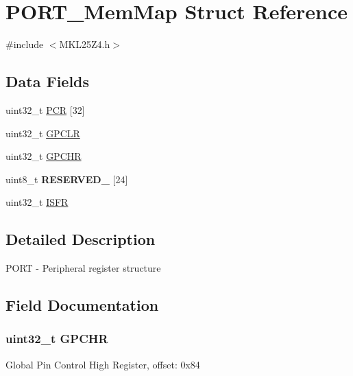 \hypertarget{struct_p_o_r_t___mem_map}{}\section{P\+O\+R\+T\+\_\+\+Mem\+Map Struct Reference}
\label{struct_p_o_r_t___mem_map}


{\ttfamily \#include $<$M\+K\+L25\+Z4.\+h$>$}

\subsection*{Data Fields}
\begin{DoxyCompactItemize}
\item 
uint32\+\_\+t \hyperlink{struct_p_o_r_t___mem_map_ad806aad894fe96382a78c6119527d0e8}{P\+C\+R} \mbox{[}32\mbox{]}
\item 
uint32\+\_\+t \hyperlink{struct_p_o_r_t___mem_map_a6e7a9e797813e20f3c1719d92158e1c9}{G\+P\+C\+L\+R}
\item 
uint32\+\_\+t \hyperlink{struct_p_o_r_t___mem_map_afad5aeb555260e7012ee2201815668a2}{G\+P\+C\+H\+R}
\item 
\hypertarget{struct_p_o_r_t___mem_map_a33a1c574e559dc57bb2fc28166bf6341}{}uint8\+\_\+t {\bfseries R\+E\+S\+E\+R\+V\+E\+D\+\_} \mbox{[}24\mbox{]}\label{struct_p_o_r_t___mem_map_a33a1c574e559dc57bb2fc28166bf6341}

\item 
uint32\+\_\+t \hyperlink{struct_p_o_r_t___mem_map_a5c88289be439e694726a8c11ae0059fc}{I\+S\+F\+R}
\end{DoxyCompactItemize}


\subsection{Detailed Description}
P\+O\+R\+T -\/ Peripheral register structure 

\subsection{Field Documentation}
\hypertarget{struct_p_o_r_t___mem_map_afad5aeb555260e7012ee2201815668a2}{}
\subsubsection[{G\+P\+C\+H\+R}]{\setlength{\rightskip}{0pt plus 5cm}uint32\+\_\+t G\+P\+C\+H\+R}\label{struct_p_o_r_t___mem_map_afad5aeb555260e7012ee2201815668a2}
Global Pin Control High Register, offset\+: 0x84 \hypertarget{struct_p_o_r_t___mem_map_a6e7a9e797813e20f3c1719d92158e1c9}{}
